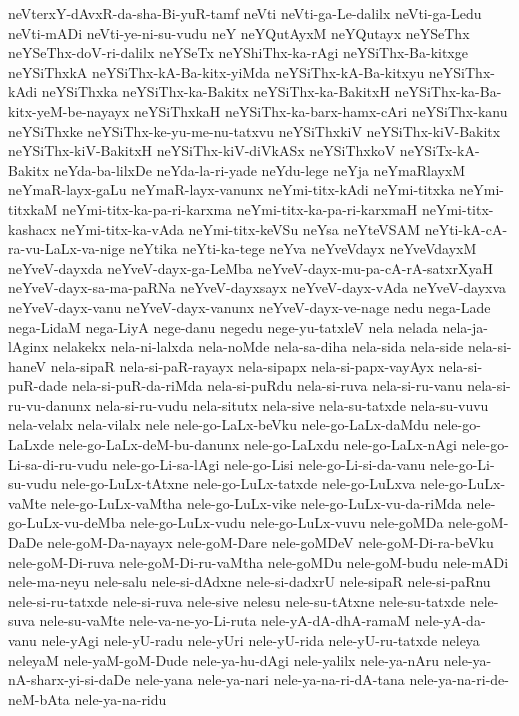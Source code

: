 {neVterxY-dAvxR-da-sha-Bi-yuR-tamf
neVti
neVti-ga-Le-dalilx
neVti-ga-Ledu
neVti-mADi
neVti-ye-ni-su-vudu
neY
neYQutAyxM
neYQutayx
neYSeThx
neYSeThx-doV-ri-dalilx
neYSeTx
neYShiThx-ka-rAgi
neYSiThx-Ba-kitxge
neYSiThxkA
neYSiThx-kA-Ba-kitx-yiMda
neYSiThx-kA-Ba-kitxyu
neYSiThx-kAdi
neYSiThxka
neYSiThx-ka-Bakitx
neYSiThx-ka-BakitxH
neYSiThx-ka-Ba-kitx-yeM-be-nayayx
neYSiThxkaH
neYSiThx-ka-barx-hamx-cAri
neYSiThx-kanu
neYSiThxke
neYSiThx-ke-yu-me-nu-tatxvu
neYSiThxkiV
neYSiThx-kiV-Bakitx
neYSiThx-kiV-BakitxH
neYSiThx-kiV-diVkASx
neYSiThxkoV
neYSiTx-kA-Bakitx
neYda-ba-lilxDe
neYda-la-ri-yade
neYdu-lege
neYja
neYmaRlayxM
neYmaR-layx-gaLu
neYmaR-layx-vanunx
neYmi-titx-kAdi
neYmi-titxka
neYmi-titxkaM
neYmi-titx-ka-pa-ri-karxma
neYmi-titx-ka-pa-ri-karxmaH
neYmi-titx-kashacx
neYmi-titx-ka-vAda
neYmi-titx-keVSu
neYsa
neYteVSAM
neYti-kA-cA-ra-vu-LaLx-va-nige
neYtika
neYti-ka-tege
neYva
neYveVdayx
neYveVdayxM
neYveV-dayxda
neYveV-dayx-ga-LeMba
neYveV-dayx-mu-pa-cA-rA-satxrXyaH
neYveV-dayx-sa-ma-paRNa
neYveV-dayxsayx
neYveV-dayx-vAda
neYveV-dayxva
neYveV-dayx-vanu
neYveV-dayx-vanunx
neYveV-dayx-ve-nage
nedu
nega-Lade
nega-LidaM
nega-LiyA
nege-danu
negedu
nege-yu-tatxleV
nela
nelada
nela-ja-lAginx
nelakekx
nela-ni-lalxda
nela-noMde
nela-sa-diha
nela-sida
nela-side
nela-si-haneV
nela-sipaR
nela-si-paR-rayayx
nela-sipapx
nela-si-papx-vayAyx
nela-si-puR-dade
nela-si-puR-da-riMda
nela-si-puRdu
nela-si-ruva
nela-si-ru-vanu
nela-si-ru-vu-danunx
nela-si-ru-vudu
nela-situtx
nela-sive
nela-su-tatxde
nela-su-vuvu
nela-velalx
nela-vilalx
nele
nele-go-LaLx-beVku
nele-go-LaLx-daMdu
nele-go-LaLxde
nele-go-LaLx-deM-bu-danunx
nele-go-LaLxdu
nele-go-LaLx-nAgi
nele-go-Li-sa-di-ru-vudu
nele-go-Li-sa-lAgi
nele-go-Lisi
nele-go-Li-si-da-vanu
nele-go-Li-su-vudu
nele-go-LuLx-tAtxne
nele-go-LuLx-tatxde
nele-go-LuLxva
nele-go-LuLx-vaMte
nele-go-LuLx-vaMtha
nele-go-LuLx-vike
nele-go-LuLx-vu-da-riMda
nele-go-LuLx-vu-deMba
nele-go-LuLx-vudu
nele-go-LuLx-vuvu
nele-goMDa
nele-goM-DaDe
nele-goM-Da-nayayx
nele-goM-Dare
nele-goMDeV
nele-goM-Di-ra-beVku
nele-goM-Di-ruva
nele-goM-Di-ru-vaMtha
nele-goMDu
nele-goM-budu
nele-mADi
nele-ma-neyu
nele-salu
nele-si-dAdxne
nele-si-dadxrU
nele-sipaR
nele-si-paRnu
nele-si-ru-tatxde
nele-si-ruva
nele-sive
nelesu
nele-su-tAtxne
nele-su-tatxde
nele-suva
nele-su-vaMte
nele-va-ne-yo-Li-ruta
nele-yA-dA-dhA-ramaM
nele-yA-da-vanu
nele-yAgi
nele-yU-radu
nele-yUri
nele-yU-rida
nele-yU-ru-tatxde
neleya
neleyaM
nele-yaM-goM-Dude
nele-ya-hu-dAgi
nele-yalilx
nele-ya-nAru
nele-ya-nA-sharx-yi-si-daDe
nele-yana
nele-ya-nari
nele-ya-na-ri-dA-tana
nele-ya-na-ri-de-neM-bAta
nele-ya-na-ridu
}
